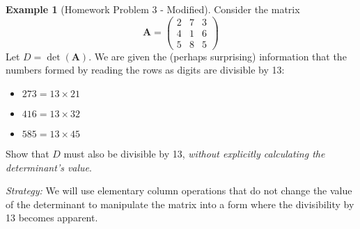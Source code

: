\documentclass[11pt]{article}
\theoremstyle{definition}
\newtheorem{example}[theorem]{Example}
\theoremstyle{remark}
\newcommand{\mat}[1]{\mathbf{#1}} %
\begin{document}
\begin{example}[Homework Problem 3 - Modified] \label{ex:det_divisibility}
Consider the matrix
\[ \mat{A} = \begin{pmatrix} 2 & 7 & 3 \\ 4 & 1 & 6 \\ 5 & 8 & 5 \end{pmatrix} \]
Let $D = \det(\mat{A})$. We are given the (perhaps surprising) information that the numbers formed by reading the rows as digits are divisible by 13:
\begin{itemize}
    \item $273 = 13 \times 21$
    \item $416 = 13 \times 32$
    \item $585 = 13 \times 45$
\end{itemize}
Show that $D$ must also be divisible by 13, \emph{without explicitly calculating the determinant's value}.

\textit{Strategy:} We will use elementary column operations that do not change the value of the determinant to manipulate the matrix into a form where the divisibility by 13 becomes apparent.


\end{example}
\end{document}
